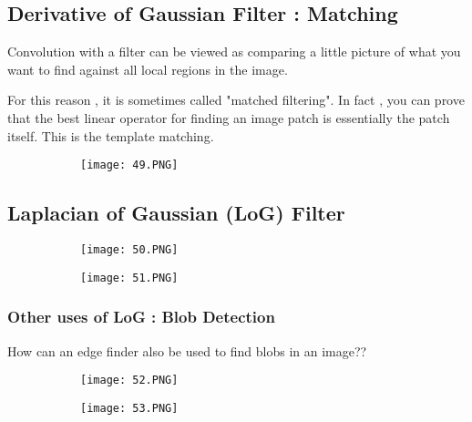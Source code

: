 \documentclass{article}
\begin{document}
\subsection{Derivative of Gaussian Filter : Matching}

Convolution with a filter can be viewed as comparing a little picture of what you want to find against all local regions in the image.

For this reason , it is sometimes called "matched filtering". In fact , you can prove that the best linear operator for finding an image patch is essentially the patch itself. This is the template matching.

\begin{figure}[ht!]
  \centering
  \begin{subfigure}[b]{0.4\linewidth}
    \texttt{[image: 49.PNG]}
  \end{subfigure}
\end{figure}


\subsection{Laplacian of Gaussian (LoG) Filter}

\begin{figure}[ht!]
  \centering
  \begin{subfigure}[b]{0.4\linewidth}
    \texttt{[image: 50.PNG]}
  \end{subfigure}
  \begin{subfigure}[b]{0.4\textwidth}
         \centering
         \texttt{[image: 51.PNG]}
     \end{subfigure}
\end{figure}

\subsubsection{Other uses of LoG : Blob Detection}

How can an edge finder also be used to find blobs in an image??

\begin{figure}[ht!]
  \centering
  \begin{subfigure}[b]{0.4\linewidth}
    \texttt{[image: 52.PNG]}
  \end{subfigure}
  \begin{subfigure}[b]{0.4\textwidth}
         \centering
         \texttt{[image: 53.PNG]}
     \end{subfigure}
\end{figure}
\end{document}
